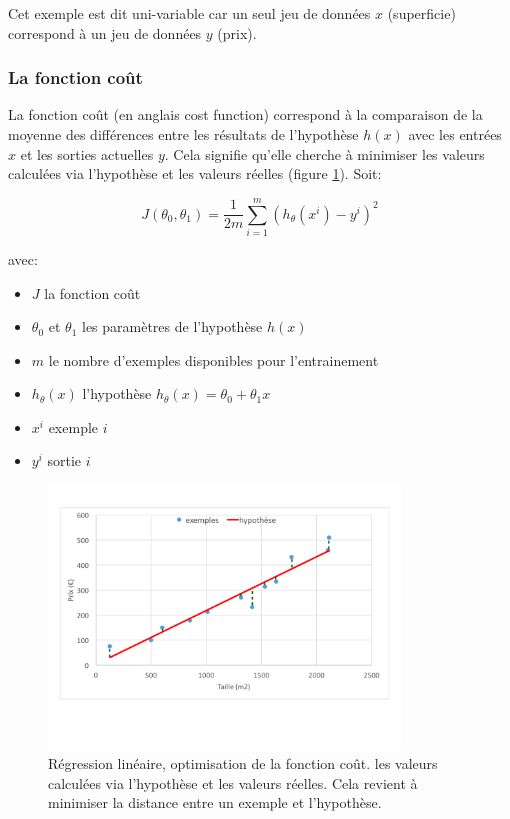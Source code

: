 Cet exemple est dit uni-variable car un seul jeu de données $x$ (superficie) correspond à un jeu de données $y$ (prix).


\subsubsection{La fonction coût}
La fonction coût (en anglais cost function) correspond à la comparaison de la moyenne des différences entre les résultats de l'hypothèse $h(x)$ avec les entrées $x$ et les sorties actuelles $y$. Cela signifie qu'elle cherche à minimiser les valeurs calculées via l'hypothèse et les valeurs réelles (figure \ref{fig:Régression linéaire, optimisation de la fonction coût}). Soit: 

\begin{equation}
	J(\theta_0,\theta_1) = \frac{1}{2m}\sum_{i=1}^{m}(h_\theta(x^i)-y^i)^2
\end{equation}

avec:
\begin{itemize}
	\item $J$ la fonction coût
	\item $\theta_0$ et $\theta_1$ les paramètres de l'hypothèse $h(x)$
	\item $m$ le nombre d'exemples disponibles pour l'entrainement 
	\item $h_\theta(x)$ l'hypothèse $h_\theta (x) = \theta_0 + \theta_1 x$
	\item $x^i$ exemple $i$
	\item $y^i$ sortie $i$
\end{itemize}

\begin{figure}[h]
	\centering\includegraphics[height=7cm]{images/cost.png}
	\caption[Régression linéaire, optimisation de la fonction coût]{Régression linéaire, optimisation de la fonction coût. les valeurs calculées via l'hypothèse et les valeurs réelles. Cela revient à minimiser la distance entre un exemple et l'hypothèse.}
	\label{fig:Régression linéaire, optimisation de la fonction coût}
\end{figure}



